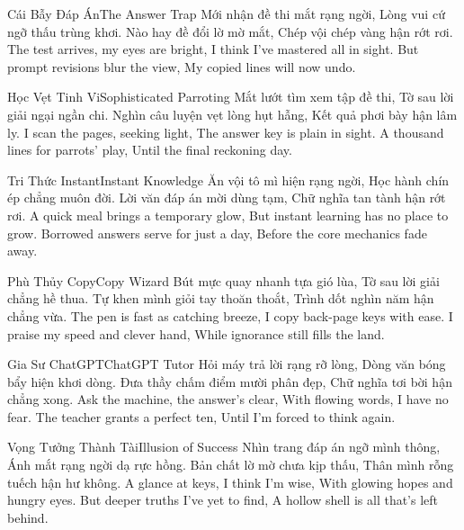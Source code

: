 \begin{tutuyetbox}{Cái Bẫy Đáp Án}{The Answer Trap}
Mới nhận đề thi mắt rạng ngời,
Lòng vui cứ ngỡ thấu trùng khơi.
Nào hay đề đổi lờ mờ mắt,
Chép vội chép vàng hận rớt rơi.
\tcblower
The test arrives, my eyes are bright,
I think I've mastered all in sight.
But prompt revisions blur the view,
My copied lines will now undo.
\end{tutuyetbox}

\begin{tutuyetbox}{Học Vẹt Tinh Vi}{Sophisticated Parroting}
Mắt lướt tìm xem tập đề thi,
Tờ sau lời giải ngại ngần chi.
Nghìn câu luyện vẹt lòng hụt hẫng,
Kết quả phơi bày hận lâm ly.
\tcblower
I scan the pages, seeking light,
The answer key is plain in sight.
A thousand lines for parrots' play,
Until the final reckoning day.
\end{tutuyetbox}

\begin{tutuyetbox}{Tri Thức Instant}{Instant Knowledge}
Ăn vội tô mì hiện rạng ngời,
Học hành chín ép chẳng muôn đời.
Lời văn đáp án mời dùng tạm,
Chữ nghĩa tan tành hận rớt rơi.
\tcblower
A quick meal brings a temporary glow,
But instant learning has no place to grow.
Borrowed answers serve for just a day,
Before the core mechanics fade away.
\end{tutuyetbox}

\begin{tutuyetbox}{Phù Thủy Copy}{Copy Wizard}
Bút mực quay nhanh tựa gió lùa,
Tờ sau lời giải chẳng hề thua.
Tự khen mình giỏi tay thoăn thoắt,
Trình dốt nghìn năm hận chẳng vừa.
\tcblower
The pen is fast as catching breeze,
I copy back-page keys with ease.
I praise my speed and clever hand,
While ignorance still fills the land.
\end{tutuyetbox}

\begin{tutuyetbox}{Gia Sư ChatGPT}{ChatGPT Tutor}
Hỏi máy trả lời rạng rỡ lòng,
Dòng văn bóng bẩy hiện khơi dòng.
Đưa thầy chấm điểm mười phân đẹp,
Chữ nghĩa tơi bời hận chẳng xong.
\tcblower
Ask the machine, the answer's clear,
With flowing words, I have no fear.
The teacher grants a perfect ten,
Until I'm forced to think again.
\end{tutuyetbox}

\begin{tutuyetbox}{Vọng Tưởng Thành Tài}{Illusion of Success}
Nhìn trang đáp án ngỡ mình thông,
Ánh mắt rạng ngời dạ rực hồng.
Bản chất lờ mờ chưa kịp thấu,
Thân mình rỗng tuếch hận hư không.
\tcblower
A glance at keys, I think I'm wise,
With glowing hopes and hungry eyes.
But deeper truths I've yet to find,
A hollow shell is all that's left behind.
\end{tutuyetbox}

